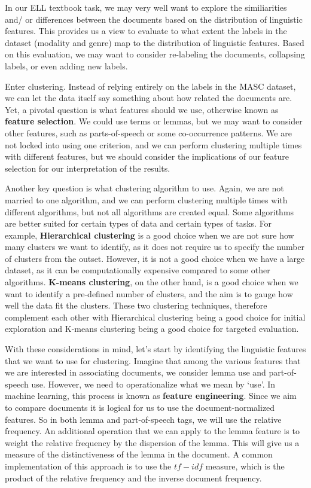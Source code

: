 \documentclass[
  letterpaper,
  DIV=11,
  numbers=noendperiod]{scrreport}
\theoremstyle{definition}
\theoremstyle{remark}
\begin{document}
In our ELL textbook task, we may very well want to explore the
similiarities and/ or differences between the documents based on the
distribution of linguistic features. This provides us a view to evaluate
to what extent the labels in the dataset (modality and genre) map to the
distribution of linguistic features. Based on this evaluation, we may
want to consider re-labeling the documents, collapsing labels, or even
adding new labels.

Enter clustering. Instead of relying entirely on the labels in the MASC
dataset, we can let the data itself say something about how related the
documents are. Yet, a pivotal question is what features should we use,
otherwise known as \textbf{feature selection}. We could use terms or
lemmas, but we may want to consider other features, such as
parts-of-speech or some co-occurrence patterns. We are not locked into
using one criterion, and we can perform clustering multiple times with
different features, but we should consider the implications of our
feature selection for our interpretation of the results.

Another key question is what clustering algorithm to use. Again, we are
not married to one algorithm, and we can perform clustering multiple
times with different algorithms, but not all algorithms are created
equal. Some algorithms are better suited for certain types of data and
certain types of tasks. For example, \textbf{Hierarchical clustering} is
a good choice when we are not sure how many clusters we want to
identify, as it does not require us to specify the number of clusters
from the outset. However, it is not a good choice when we have a large
dataset, as it can be computationally expensive compared to some other
algorithms. \textbf{K-means clustering}, on the other hand, is a good
choice when we want to identify a pre-defined number of clusters, and
the aim is to gauge how well the data fit the clusters. These two
clustering techniques, therefore complement each other with Hierarchical
clustering being a good choice for initial exploration and K-means
clustering being a good choice for targeted evaluation.

With these considerations in mind, let's start by identifying the
linguistic features that we want to use for clustering. Imagine that
among the various features that we are interested in associating
documents, we consider lemma use and part-of-speech use. However, we
need to operationalize what we mean by `use'. In machine learning, this
process is known as \textbf{feature engineering}. Since we aim to
compare documents it is logical for us to use the document-normalized
features. So in both lemma and part-of-speech tags, we will use the
relative frequency. An additional operation that we can apply to the
lemma feature is to weight the relative frequency by the dispersion of
the lemma. This will give us a measure of the distinctiveness of the
lemma in the document. A common implementation of this approach is to
use the \(tf-idf\) measure, which is the product of the relative
frequency and the inverse document frequency.
\end{document}
